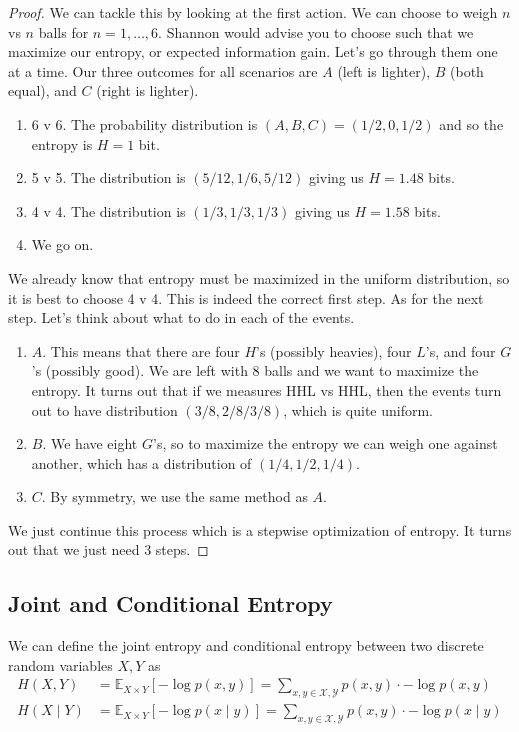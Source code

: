 \documentclass{article}
\begin{document}
    \begin{proof}
      We can tackle this by looking at the first action. We can choose to weigh $n$ vs $n$ balls for $n = 1, \ldots, 6$. Shannon would advise you to choose such that we maximize our entropy, or expected information gain. Let's go through them one at a time. Our three outcomes for all scenarios are $A$ (left is lighter), $B$ (both equal), and $C$ (right is lighter). 
      \begin{enumerate}
        \item 6 v 6. The probability distribution is $(A, B, C) = (1/2, 0, 1/2)$ and so the entropy is $H = 1$ bit. 
        \item 5 v 5. The distribution is $(5/12, 1/6, 5/12)$ giving us $H = 1.48$ bits. 
        \item 4 v 4. The distribution is $(1/3, 1/3, 1/3)$ giving us $H = 1.58$ bits. 
        \item We go on. 
      \end{enumerate}
      We already know that entropy must be maximized in the uniform distribution, so it is best to choose 4 v 4. This is indeed the correct first step. As for the next step. Let's think about what to do in each of the events. 
      \begin{enumerate}
        \item $A$. This means that there are four $H$'s (possibly heavies), four $L$'s, and four $G$'s (possibly good). We are left with 8 balls and we want to maximize the entropy. It turns out that if we measures HHL vs HHL, then the events turn out to have distribution $(3/8, 2/8/ 3/8)$, which is quite uniform.  
        \item $B$. We have eight $G$'s, so to maximize the entropy we can weigh one against another, which has a distribution of $(1/4, 1/2, 1/4)$. 
        \item $C$. By symmetry, we use the same method as $A$. 
      \end{enumerate}
      We just continue this process which is a stepwise optimization of entropy. It turns out that we just need 3 steps. 
    \end{proof}

  \subsection{Joint and Conditional Entropy}

    \begin{definition}
      We can define the joint entropy and conditional entropy between two discrete random variables $X, Y$ as 
      \begin{align*}
        H(X, Y) & = \mathbb{E}_{X \times Y} [-\log p(x, y)] = \sum_{x, y \in \mathcal{X}, \mathcal{Y}} p(x, y) \cdot - \log p(x, y) \\
        H(X \mid Y) & = \mathbb{E}_{X \times Y} [- \log p(x \mid y)]  = \sum_{x, y \in \mathcal{X}, \mathcal{Y}} p(x, y) \cdot - \log p(x \mid y )
      \end{align*}
    \end{definition}
\end{document}
